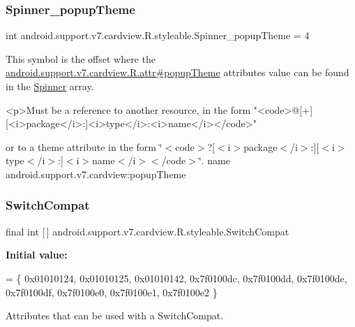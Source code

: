 \subsubsection{\texorpdfstring{Spinner\+\_\+popup\+Theme}{Spinner\_popupTheme}}
{\footnotesize\ttfamily int android.\+support.\+v7.\+cardview.\+R.\+styleable.\+Spinner\+\_\+popup\+Theme = 4\hspace{0.3cm}{\ttfamily [static]}}

This symbol is the offset where the \hyperlink{classandroid_1_1support_1_1v7_1_1cardview_1_1R_1_1attr_a6361a1d29dba71235a7925dc34e36e20}{android.\+support.\+v7.\+cardview.\+R.\+attr\#popup\+Theme} attribute\textquotesingle{}s value can be found in the \hyperlink{classandroid_1_1support_1_1v7_1_1cardview_1_1R_1_1styleable_a84bb9d44bbc6f8ef3357f2510af054d5}{Spinner} array.

\begin{DoxyVerb}      <p>Must be a reference to another resource, in the form "<code>@[+][<i>package</i>:]<i>type</i>:<i>name</i></code>"
\end{DoxyVerb}
 or to a theme attribute in the form \char`\"{}$<$code$>$?\mbox{[}$<$i$>$package$<$/i$>$\+:\mbox{]}\mbox{[}$<$i$>$type$<$/i$>$\+:\mbox{]}$<$i$>$name$<$/i$>$$<$/code$>$\char`\"{}.  name android.\+support.\+v7.\+cardview\+:popup\+Theme \mbox{\label{classandroid_1_1support_1_1v7_1_1cardview_1_1R_1_1styleable_a8b1fbe9bb91473a7977ff98951ed5255}} 
\subsubsection{\texorpdfstring{Switch\+Compat}{SwitchCompat}}
{\footnotesize\ttfamily final int \mbox{[}$\,$\mbox{]} android.\+support.\+v7.\+cardview.\+R.\+styleable.\+Switch\+Compat\hspace{0.3cm}{\ttfamily [static]}}

{\bfseries Initial value\+:}
\begin{DoxyCode}
= \{
            0x01010124, 0x01010125, 0x01010142, 0x7f0100dc,
            0x7f0100dd, 0x7f0100de, 0x7f0100df, 0x7f0100e0,
            0x7f0100e1, 0x7f0100e2
        \}
\end{DoxyCode}
Attributes that can be used with a Switch\+Compat. 

